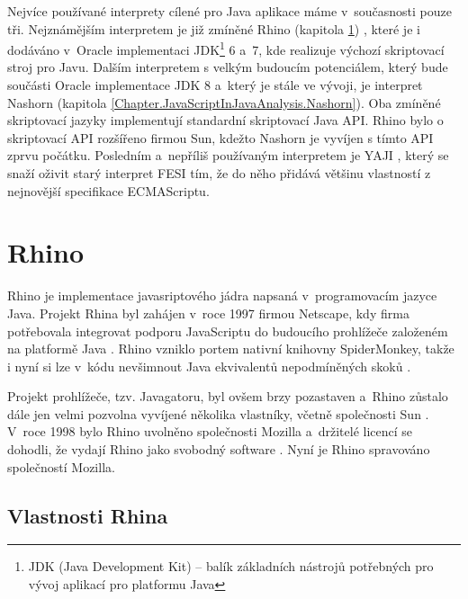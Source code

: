 Nejvíce používané interprety cílené pro Java aplikace máme v~současnosti pouze tři. Nejznámějším interpretem je již zmíněné Rhino (kapitola \ref{Chapter.JavaScriptInJavaAnalysis.Rhino}) \cite{Bibliography.Rhino.Docs}, které je i dodáváno v~Oracle implementaci JDK\footnote{JDK (Java Development Kit) -- balík základních nástrojů potřebných pro vývoj aplikací pro platformu Java} 6 a~7, kde realizuje výchozí skriptovací stroj pro Javu. Dalším interpretem s velkým budoucím potenciálem, který bude součásti Oracle implementace JDK 8 a~který je stále ve vývoji, je interpret Nashorn \cite{Bibliography.Nashorn.Project} (kapitola \ref{Chapter.JavaScriptInJavaAnalysis.Nashorn}). Oba zmíněné skriptovací jazyky implementují standardní skriptovací Java API. Rhino bylo o skriptovací API rozšířeno firmou Sun, kdežto Nashorn je vyvíjen s tímto API zprvu počátku. Posledním a~nepříliš používaným interpretem je YAJI \cite{Bibliography.YAJI.Project}, který se snaží oživit starý interpret FESI \cite{Bibliography.FESI.Project} tím, že do něho přidává většinu vlastností z nejnovější specifikace ECMAScriptu.

\section{Rhino}
\label{Chapter.JavaScriptInJavaAnalysis.Rhino}

Rhino je implementace javasriptového jádra napsaná v~programovacím jazyce Java. Projekt Rhina byl zahájen v~roce 1997 firmou Netscape, kdy firma potřebovala integrovat podporu JavaScriptu do budoucího prohlížeče založeném na platformě Java \cite{Bibliography.Rhino.History}. Rhino vzniklo portem nativní knihovny SpiderMonkey, takže i nyní si lze v~kódu nevšimnout Java ekvivalentů nepodmíněných skoků \cite{Bibliography.Rhino.History}.

Projekt prohlížeče, tzv. Javagatoru, byl ovšem brzy pozastaven a~Rhino zůstalo dále jen velmi pozvolna vyvíjené několika vlastníky, včetně společnosti Sun \cite{Bibliography.Rhino.History}. V~roce 1998 bylo Rhino uvolněno společnosti Mozilla a~držitelé licencí se dohodli, že vydají Rhino jako svobodný software \cite{Bibliography.Rhino.History}. Nyní je Rhino spravováno společností Mozilla.

\subsection{Vlastnosti Rhina}
\label{Chapter.JavaScriptInJavaAnalysis.Rhino.RhinoFeatures}

